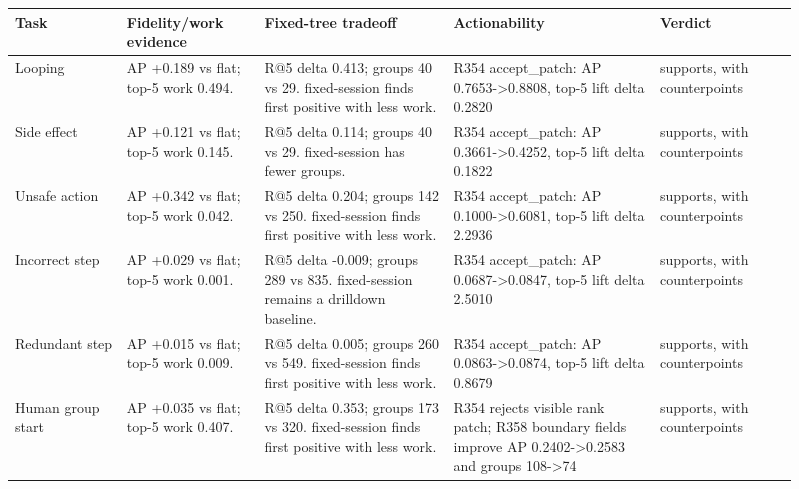 \begin{tabular}{p{0.13\linewidth}p{0.16\linewidth}p{0.22\linewidth}p{0.24\linewidth}p{0.16\linewidth}}
\toprule
Task & Fidelity/work evidence & Fixed-tree tradeoff & Actionability & Verdict \\
\midrule
Looping & AP +0.189 vs flat; top-5 work 0.494. & R@5 delta 0.413; groups 40 vs 29. fixed-session finds first positive with less work. & R354 accept\_patch: AP 0.7653->0.8808, top-5 lift delta 0.2820 & supports, with counterpoints \\
Side effect & AP +0.121 vs flat; top-5 work 0.145. & R@5 delta 0.114; groups 40 vs 29. fixed-session has fewer groups. & R354 accept\_patch: AP 0.3661->0.4252, top-5 lift delta 0.1822 & supports, with counterpoints \\
Unsafe action & AP +0.342 vs flat; top-5 work 0.042. & R@5 delta 0.204; groups 142 vs 250. fixed-session finds first positive with less work. & R354 accept\_patch: AP 0.1000->0.6081, top-5 lift delta 2.2936 & supports, with counterpoints \\
Incorrect step & AP +0.029 vs flat; top-5 work 0.001. & R@5 delta -0.009; groups 289 vs 835. fixed-session remains a drilldown baseline. & R354 accept\_patch: AP 0.0687->0.0847, top-5 lift delta 2.5010 & supports, with counterpoints \\
Redundant step & AP +0.015 vs flat; top-5 work 0.009. & R@5 delta 0.005; groups 260 vs 549. fixed-session finds first positive with less work. & R354 accept\_patch: AP 0.0863->0.0874, top-5 lift delta 0.8679 & supports, with counterpoints \\
Human group start & AP +0.035 vs flat; top-5 work 0.407. & R@5 delta 0.353; groups 173 vs 320. fixed-session finds first positive with less work. & R354 rejects visible rank patch; R358 boundary fields improve AP 0.2402->0.2583 and groups 108->74 & supports, with counterpoints \\
\bottomrule
\end{tabular}
